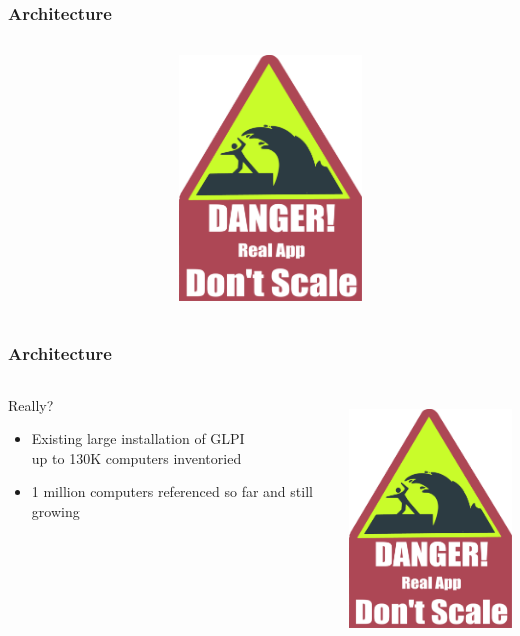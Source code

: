 \documentclass{beamer}
\begin{document}
\begin{frame}
    \frametitle{Architecture}

 \begin{columns}
 \begin{column}{0.34\textwidth}
 \end{column}
 \begin{column}{0.90\textwidth}
    \includegraphics[height=6.5cm]{pics/scale.pdf}
 \end{column}
\end{columns}

\end{frame}

\begin{frame}
    \frametitle{Architecture}

 \begin{columns}
 \begin{column}{0.34\textwidth}
    \begin{block}{Really?}
        \begin{itemize}
            \item Existing large installation of GLPI \\
            {\small up to 130K computers inventoried}
            \item 1 million computers referenced so far and still growing
        \end{itemize}
    \end{block}

 \end{column}
 \begin{column}{0.90\textwidth}
    \includegraphics[height=6.5cm]{pics/scale.pdf}

 \end{column}
\end{columns}

\end{frame}
\end{document}
